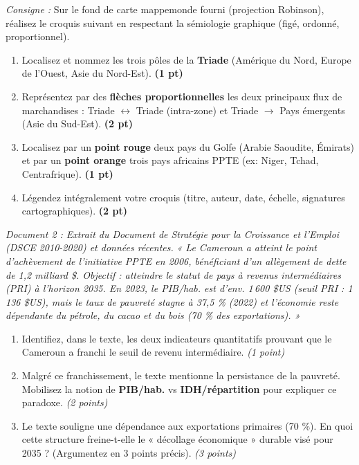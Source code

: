 \documentclass[11pt]{article}
\begin{document}
\begin{exercice}
\emph{Consigne :} Sur le fond de carte mappemonde fourni (projection Robinson), réalisez le croquis suivant en respectant la sémiologie graphique (figé, ordonné, proportionnel).

\providecommand{\barème}[1]{\textbf{(#1 pt)}}
\begin{enumerate}
    \item Localisez et nommez les trois pôles de la \textbf{Triade} (Amérique du Nord, Europe de l'Ouest, Asie du Nord-Est). \barème{1}
    \item Représentez par des \textbf{flèches proportionnelles} les deux principaux flux de marchandises : Triade $\leftrightarrow$ Triade (intra-zone) et Triade $\rightarrow$ Pays émergents (Asie du Sud-Est). \barème{2}
    \item Localisez par un \textbf{point rouge} deux pays du Golfe (Arabie Saoudite, Émirats) et par un \textbf{point orange} trois pays africains PPTE (ex: Niger, Tchad, Centrafrique). \barème{1}
    \item Légendez intégralement votre croquis (titre, auteur, date, échelle, signatures cartographiques). \barème{2}
\end{enumerate}
\end{exercice}

\begin{exercice}
\emph{Document 2 : Extrait du Document de Stratégie pour la Croissance et l'Emploi (DSCE 2010-2020) et données récentes.}
\textit{« Le Cameroun a atteint le point d'achèvement de l'initiative PPTE en 2006, bénéficiant d'un allègement de dette de 1,2 milliard \$. Objectif : atteindre le statut de pays à revenus intermédiaires (PRI) à l'horizon 2035. En 2023, le PIB/hab. est d'env. 1\,600 \$US (seuil PRI : 1\,136 \$US), mais le taux de pauvreté stagne à 37,5 \% (2022) et l'économie reste dépendante du pétrole, du cacao et du bois (70 \% des exportations). »}

\begin{enumerate}
    \item Identifiez, dans le texte, les deux indicateurs quantitatifs prouvant que le Cameroun a franchi le seuil de revenu intermédiaire. \hfill\textit{(1 point)}
    \item Malgré ce franchissement, le texte mentionne la persistance de la pauvreté. Mobilisez la notion de \textbf{PIB/hab.} vs \textbf{IDH/répartition} pour expliquer ce paradoxe. \hfill\textit{(2 points)}
    \item Le texte souligne une dépendance aux exportations primaires (70 \%). En quoi cette structure freine-t-elle le « décollage économique » durable visé pour 2035 ? (Argumentez en 3 points précis). \hfill\textit{(3 points)}
\end{enumerate}
\end{exercice}
\end{document}
